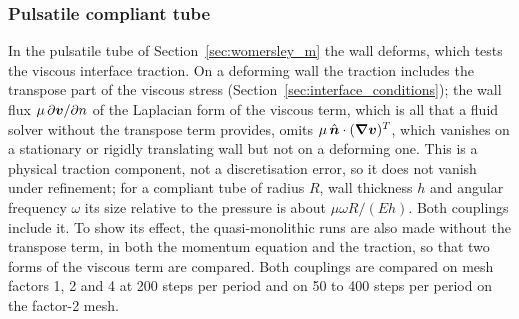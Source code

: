 \subsubsection{Pulsatile compliant tube}\label{sec:womersley_consistency}

In the pulsatile tube of Section~\ref{sec:womersley_m} the wall deforms, which tests the viscous interface traction.
On a deforming wall the traction includes the transpose part of the viscous stress (Section~\ref{sec:interface_conditions}); the wall flux $\mu\,\partial\boldsymbol{v}/\partial n$ of the Laplacian form of the viscous term, which is all that a fluid solver without the transpose term provides, omits $\mu\,\hat{\boldsymbol{n}}\cdot(\boldsymbol{\nabla}\boldsymbol{v})^{T}$, which vanishes on a stationary or rigidly translating wall but not on a deforming one.
This is a physical traction component, not a discretisation error, so it does not vanish under refinement; for a compliant tube of radius $R$, wall thickness $h$ and angular frequency $\omega$ its size relative to the pressure is about $\mu\omega R/(Eh)$.
Both couplings include it.
To show its effect, the quasi-monolithic runs are also made without the transpose term, in both the momentum equation and the traction, so that two forms of the viscous term are compared.
Both couplings are compared on mesh factors 1, 2 and 4 at 200 steps per period and on 50 to 400 steps per period on the factor-2 mesh.

